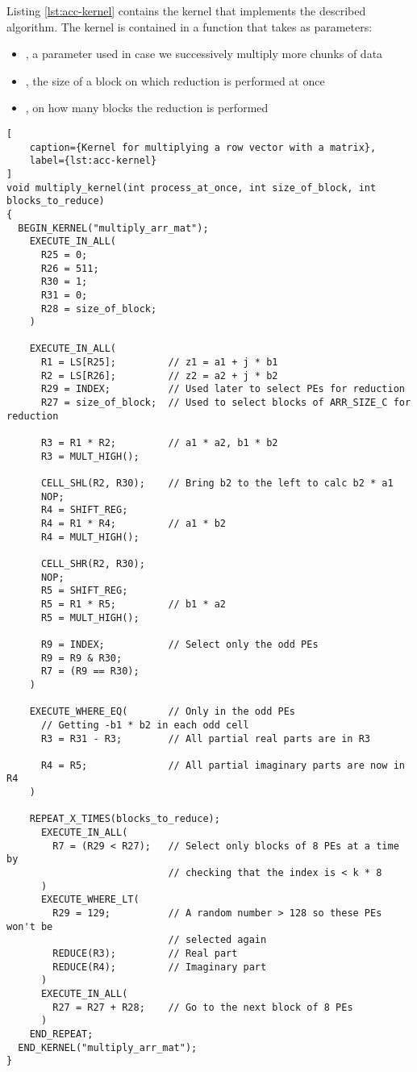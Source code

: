 Listing \ref{lst:acc-kernel} contains the kernel that implements the described
algorithm. The kernel is contained in a function that takes as parameters:
\begin{itemize}
  \item {}, a parameter used in case we successively
        multiply more chunks of data
  \item {}, the size of a block on which reduction is performed 
        at once
  \item {}, on how many blocks the reduction is performed
\end{itemize}

\begin{lstlisting}[
    caption={Kernel for multiplying a row vector with a matrix},
    label={lst:acc-kernel}
]
void multiply_kernel(int process_at_once, int size_of_block, int blocks_to_reduce)
{
  BEGIN_KERNEL("multiply_arr_mat");
    EXECUTE_IN_ALL(
      R25 = 0;
      R26 = 511;
      R30 = 1;
      R31 = 0;
      R28 = size_of_block;  
    )

    EXECUTE_IN_ALL(
      R1 = LS[R25];         // z1 = a1 + j * b1
      R2 = LS[R26];         // z2 = a2 + j * b2
      R29 = INDEX;          // Used later to select PEs for reduction
      R27 = size_of_block;  // Used to select blocks of ARR_SIZE_C for reduction

      R3 = R1 * R2;         // a1 * a2, b1 * b2
      R3 = MULT_HIGH();

      CELL_SHL(R2, R30);    // Bring b2 to the left to calc b2 * a1
      NOP;
      R4 = SHIFT_REG;
      R4 = R1 * R4;         // a1 * b2
      R4 = MULT_HIGH();

      CELL_SHR(R2, R30);
      NOP;
      R5 = SHIFT_REG;
      R5 = R1 * R5;         // b1 * a2
      R5 = MULT_HIGH();

      R9 = INDEX;           // Select only the odd PEs
      R9 = R9 & R30;
      R7 = (R9 == R30);
    )

    EXECUTE_WHERE_EQ(       // Only in the odd PEs
      // Getting -b1 * b2 in each odd cell
      R3 = R31 - R3;        // All partial real parts are in R3

      R4 = R5;              // All partial imaginary parts are now in R4
    )

    REPEAT_X_TIMES(blocks_to_reduce);
      EXECUTE_IN_ALL(
        R7 = (R29 < R27);   // Select only blocks of 8 PEs at a time by
                            // checking that the index is < k * 8
      )
      EXECUTE_WHERE_LT(
        R29 = 129;          // A random number > 128 so these PEs won't be
                            // selected again
        REDUCE(R3);         // Real part
        REDUCE(R4);         // Imaginary part
      )
      EXECUTE_IN_ALL(
        R27 = R27 + R28;    // Go to the next block of 8 PEs
      )
    END_REPEAT;
  END_KERNEL("multiply_arr_mat");
}
\end{lstlisting}

